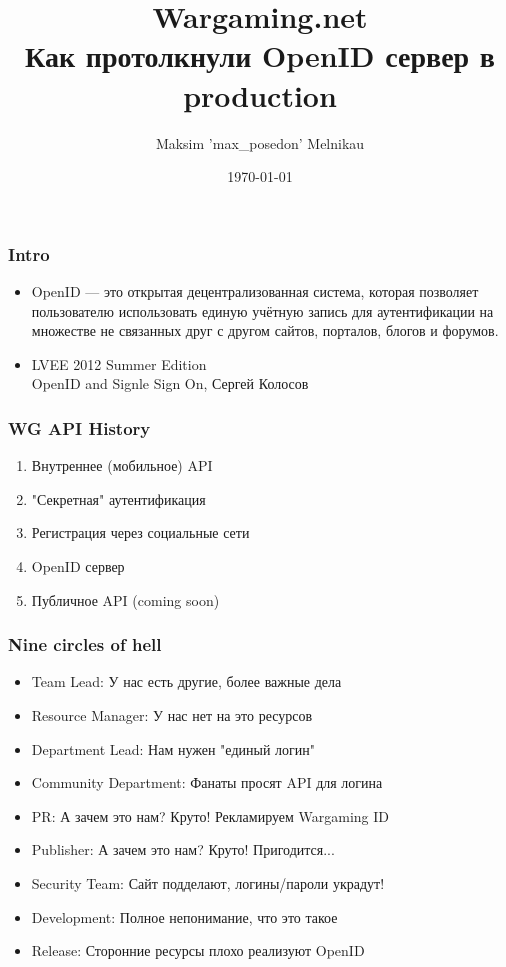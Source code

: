 \documentclass{beamer}
\begin{document}
\title{Wargaming.net\\Как протолкнули OpenID сервер в production}
\author{Maksim 'max\_posedon' Melnikau}
\date{\today}
\frame{\titlepage}

\begin{frame}[fragile]
    \frametitle{Intro}
    \begin{itemize}
    \item OpenID --- это открытая децентрализованная система, которая позволяет пользователю использовать единую учётную запись для аутентификации на множестве не связанных друг с другом сайтов, порталов, блогов и форумов.
    \item LVEE 2012 Summer Edition\\ OpenID and Signle Sign On, Сергей Колосов
    \end{itemize}
\end{frame}

\begin{frame}[fragile]
    \frametitle{WG API History}
    \begin{enumerate}
    \item Внутреннее (мобильное) API
    \item "Секретная" аутентификация 
    \item Регистрация через социальные сети
    \item OpenID сервер
    \item Публичное API (coming soon)
    \end{enumerate}
\end{frame}

\begin{frame}[fragile]
    \frametitle{Nine circles of hell}
    \begin{itemize}
    \item Team Lead: У нас есть другие, более важные дела
    \pause
    \item Resource Manager: У нас нет на это ресурсов
    \pause
    \item Department Lead: Нам нужен "единый логин"
    \pause
    \item Community Department: Фанаты просят API для логина
    \pause
    \item PR: А зачем это нам? Круто! Рекламируем Wargaming ID
    \pause
    \item Publisher: А зачем это нам? Круто! Пригодится...
    \pause
    \item Security Team: Сайт подделают, логины/пароли украдут!
    \pause
    \item Development: Полное непонимание, что это такое
    \pause
    \item Release: Сторонние ресурсы плохо реализуют OpenID
    \end{itemize}
\end{frame}

\end{document}
